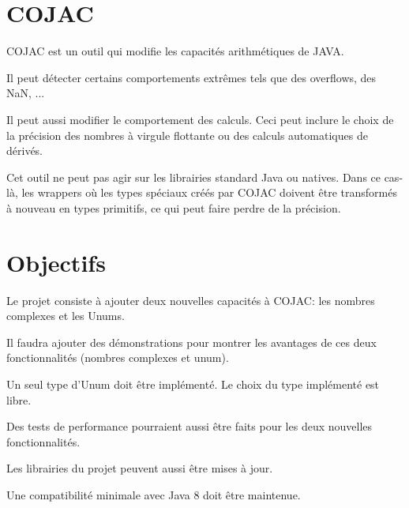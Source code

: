 \documentclass[11pt]{meetingmins}
\begin{document}
\section{COJAC}
\begin{hiddenitems}
    \item COJAC est un outil qui modifie les capacités arithmétiques de JAVA.
    \item Il peut détecter certains comportements extrêmes tels que des overflows, des NaN, ...
    \item Il peut aussi modifier le comportement des calculs. Ceci peut inclure le choix de la précision des nombres à virgule flottante ou des calculs automatiques de dérivés.
    \item Cet outil ne peut pas agir sur les librairies standard Java ou natives. Dans ce cas-là, les wrappers où les types spéciaux créés par COJAC doivent être transformés à nouveau en types primitifs, ce qui peut faire perdre de la précision.
\end{hiddenitems}

\section{Objectifs}
\begin{hiddenitems}
    \item Le projet consiste à ajouter deux nouvelles capacités à COJAC: les nombres complexes et les Unums.
    \item Il faudra ajouter des démonstrations pour montrer les avantages de ces deux fonctionnalités (nombres complexes et unum).
    \item Un seul type d'Unum doit être implémenté. Le choix du type implémenté est libre.
    \item Des tests de performance pourraient aussi être faits pour les deux nouvelles fonctionnalités.
    \item Les librairies du projet peuvent aussi être mises à jour.
    \item Une compatibilité minimale avec Java 8 doit être maintenue.
\end{hiddenitems}
\end{document}
